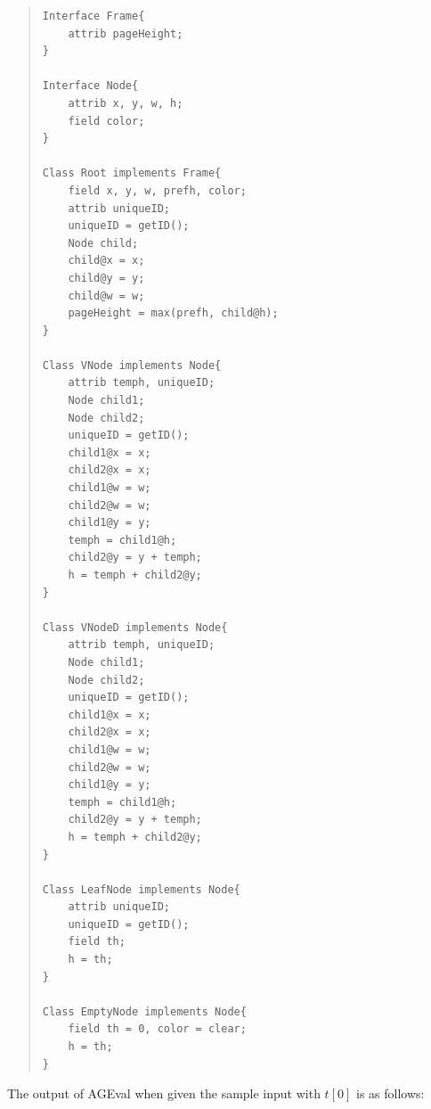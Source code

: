 \documentclass[11pt]{article}
\begin{document}
\begin{quote}
\begin{lstlisting}
Interface Frame{
	attrib pageHeight;
}

Interface Node{
	attrib x, y, w, h;
	field color;
}

Class Root implements Frame{
	field x, y, w, prefh, color;
	attrib uniqueID;
	uniqueID = getID();
	Node child;
	child@x = x;
	child@y = y;
	child@w = w;
	pageHeight = max(prefh, child@h);
}

Class VNode implements Node{
	attrib temph, uniqueID;
	Node child1;
	Node child2;
	uniqueID = getID();
	child1@x = x;
	child2@x = x;
	child1@w = w;
	child2@w = w;
	child1@y = y;
	temph = child1@h;
	child2@y = y + temph;
	h = temph + child2@y;
}

Class VNodeD implements Node{
	attrib temph, uniqueID;
	Node child1;
	Node child2;
	uniqueID = getID();
	child1@x = x;
	child2@x = x;
	child1@w = w;
	child2@w = w;
	child1@y = y;
	temph = child1@h;
	child2@y = y + temph;
	h = temph + child2@y;
}

Class LeafNode implements Node{
	attrib uniqueID;
	uniqueID = getID();
	field th;
	h = th;
}

Class EmptyNode implements Node{
	field th = 0, color = clear;
	h = th;
}
\end{lstlisting}
\end{quote}

The output of AGEval when given the sample input with $t[0]$ is as follows:
\end{document}
